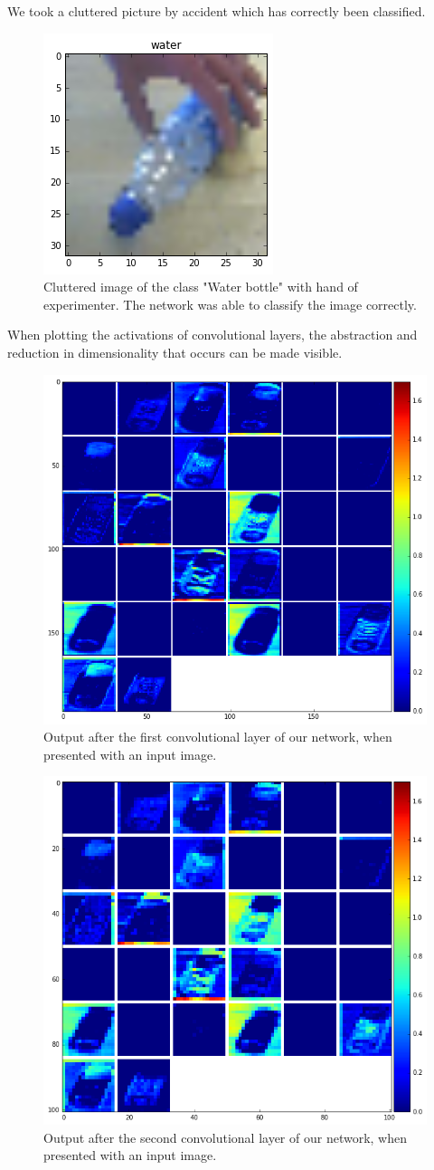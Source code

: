 \documentclass[	DIV=calc,%
				paper=a4,%
				fontsize=11pt,%
				twocolumn]{scrartcl}	 %
\begin{document}
We took a cluttered picture by accident which has correctly been classified.

\begin{figure}[H]
    \centering
    \includegraphics[width=0.5\linewidth]{data/cluttered_image}
    \caption{Cluttered image of the class "Water bottle" with hand of experimenter. The network was able to classify the image correctly.}
\end{figure}

When plotting the activations of convolutional layers, the abstraction and reduction in dimensionality that occurs can be made visible.

\begin{figure}[H]
    \centering
    \includegraphics[width=0.5\linewidth]{data/final_cnn_firstlayer}
    \caption{Output after the first convolutional layer of our network, when presented with an input image.}
\end{figure}

\begin{figure}[H]
    \centering
    \includegraphics[width=0.5\linewidth]{data/final_cnn_secondlayer}
    \caption{Output after the second convolutional layer of our network, when presented with an input image.}
\end{figure}
\end{document}
